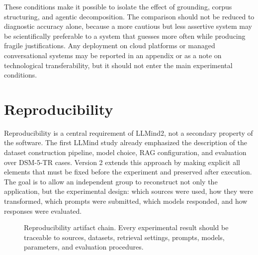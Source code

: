 \documentclass[11pt,a4paper]{article}
\newcommand{\llmind}{LLMind2}
\begin{document}
These conditions make it possible to isolate the effect of grounding, corpus structuring, and agentic decomposition. The comparison should not be reduced to diagnostic accuracy alone, because a more cautious but less assertive system may be scientifically preferable to a system that guesses more often while producing fragile justifications. Any deployment on cloud platforms or managed conversational systems may be reported in an appendix or as a note on technological transferability, but it should not enter the main experimental conditions.

\section{Reproducibility}
Reproducibility is a central requirement of \llmind, not a secondary property of the software. The first LLMind study already emphasized the description of the dataset construction pipeline, model choice, RAG configuration, and evaluation over DSM-5-TR cases. Version 2 extends this approach by making explicit all elements that must be fixed before the experiment and preserved after execution. The goal is to allow an independent group to reconstruct not only the application, but the experimental design: which sources were used, how they were transformed, which prompts were submitted, which models responded, and how responses were evaluated.

\begin{figure}[htbp]
\centering
{}
\caption{Reproducibility artifact chain. Every experimental result should be traceable to sources, datasets, retrieval settings, prompts, models, parameters, and evaluation procedures.}
\label{fig:reproducibility-en}
\end{figure}
\end{document}
